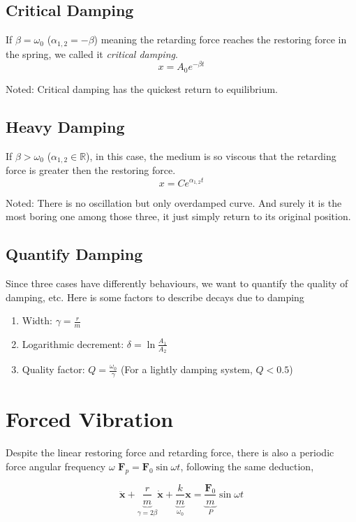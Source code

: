 \documentclass[openany]{book}
\begin{document}
\subsection{Critical Damping}
If $\beta =\omega _0$ ($\alpha _{1,2}=-\beta $) meaning the retarding force reaches the restoring force in the spring, we called it \emph{critical damping}. 
\[x=A_0e^{-\beta t}\]

Noted: Critical damping has the quickest return to equilibrium.
\subsection{Heavy Damping}
If $\beta >\omega _0$ ($\alpha _{1,2}\in \mathbb{R}$), in this case, the medium is so viscous that the retarding force is greater then the restoring force.
\[x=Ce^{\alpha _{1,2}t}\]

Noted: There is no oscillation but only overdamped curve. And surely it is the most boring one among those three, it just simply return to its original position.
\subsection{Quantify Damping}
Since three cases have differently behaviours, we want to quantify the quality of damping, etc. Here is some factors to describe decays due to damping
\begin{enumerate}
\item Width: $\gamma =\frac{r}{m}$
\item Logarithmic decrement: $\delta =\ln \frac{A_1}{A_2}$
\item Quality factor: $Q=\frac{\omega _0}{\gamma}$ (For a lightly damping system, $Q<0.5$)
\end{enumerate}

\section{Forced Vibration}
Despite the linear restoring force and retarding force, there is also a periodic force angular frequency $\omega $ $\mathbf{F}_p=\mathbf{F}_0\sin \omega t$, following the same deduction,

\begin{equation}\label{eq:5}
\ddot{\mathbf{x}}+\underbrace{\frac{r}{m}}_{\gamma =2\beta}\dot{\mathbf{x}}+\underbrace{\frac{k}{m}}_{\omega _0}\mathbf{x}=\underbrace{\frac{\mathbf{F}_0}{m}}_{P}\sin \omega t
\end{equation}
\end{document}
